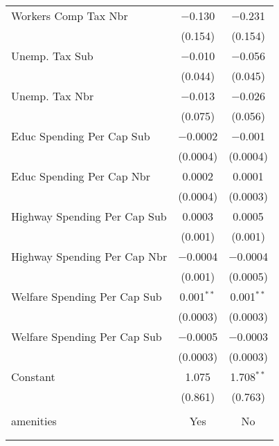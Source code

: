 \begin{table}[!htbp]
\begin{tabular}{@{\extracolsep{5pt}}lcc}
  Workers Comp Tax Nbr & $-$0.130 & $-$0.231 \\ 
  & (0.154) & (0.154) \\ 
  Unemp. Tax Sub & $-$0.010 & $-$0.056 \\ 
  & (0.044) & (0.045) \\ 
  Unemp. Tax Nbr & $-$0.013 & $-$0.026 \\ 
  & (0.075) & (0.056) \\ 
  Educ Spending Per Cap Sub & $-$0.0002 & $-$0.001 \\ 
  & (0.0004) & (0.0004) \\ 
  Educ Spending Per Cap Nbr & 0.0002 & 0.0001 \\ 
  & (0.0004) & (0.0003) \\ 
  Highway Spending Per Cap Sub & 0.0003 & 0.0005 \\ 
  & (0.001) & (0.001) \\ 
  Highway Spending Per Cap Nbr & $-$0.0004 & $-$0.0004 \\ 
  & (0.001) & (0.0005) \\ 
  Welfare Spending Per Cap Sub & 0.001$^{**}$ & 0.001$^{**}$ \\ 
  & (0.0003) & (0.0003) \\ 
  Welfare Spending Per Cap Sub & $-$0.0005 & $-$0.0003 \\ 
  & (0.0003) & (0.0003) \\ 
  Constant & 1.075 & 1.708$^{**}$ \\ 
  & (0.861) & (0.763) \\ 
 \hline \\[-1.8ex] 
amenities & Yes & No \\ 
\hline \\[-1.8ex] 
\hline 
\hline \\[-1.8ex] 
\end{tabular} 
\end{table} 
